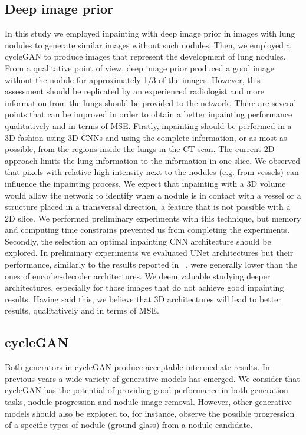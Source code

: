 \documentclass[runningheads]{llncs}
\begin{document}
\subsection{Deep image prior}
In this study we employed inpainting with deep image prior in images with lung nodules to generate similar images without such nodules. Then, we employed a cycleGAN to produce images that represent the development of lung nodules. From a qualitative point of view, deep image prior produced a good image without the nodule for approximately 1/3 of the images. However, this assessment should be replicated by an experienced radiologist and more information from the lungs should be provided to the network. 
There are several points that can be improved in order to obtain a better inpainting performance qualitatively and in terms of MSE. Firstly, inpainting should be performed in a 3D fashion using 3D CNNs and using the complete information, or as most as possible, from the regions inside the lungs in the CT scan. The current 2D approach limits the lung information to the information in one slice. We observed that pixels with relative high intensity next to the nodules (e.g. from vessels) can influence the inpainting process. We expect that inpainting with a 3D volume would allow the network to identify when a nodule is in contact with a vessel or a structure placed in a transversal direction, a feature that is not possible with a 2D slice. We performed preliminary experiments with this technique, but memory and computing time constrains prevented us from completing the experiments. Secondly, the selection an optimal inpainting CNN architecture should be explored. In preliminary experiments we evaluated UNet architectures but their performance, similarly to the results reported in ~\cite{DBLP:journals/corr/abs-1711-10925}, were generally lower than the ones of encoder-decoder architectures. We deem valuable studying deeper architectures, especially for those images that do not achieve good inpainting results. Having said this, we believe that 3D architectures will lead to better results, qualitatively and in terms of MSE.

\subsection{cycleGAN}
Both generators in cycleGAN produce acceptable intermediate results. 
In previous years a wide variety of generative models has emerged. We consider that cycleGAN has the potential of providing good performance in both generation tasks, nodule progression and nodule image removal. However, other generative models should also be explored to, for instance, observe the possible progression of a specific types of nodule (ground glass) from a nodule candidate. 
\end{document}
